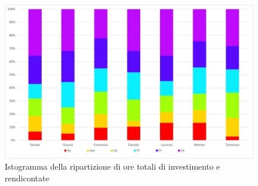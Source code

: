 \begin{figure}[H]
    \centering
    \includegraphics[scale = 0.5]{components/img/Totale-non-rendicontate-isto.png}
    \caption{ Istogramma della ripartizione di ore totali di investimento e rendicontate}
    \label{fig:Istogramma ripartizione ore totali di investimento e rendicontate }
\end{figure}
